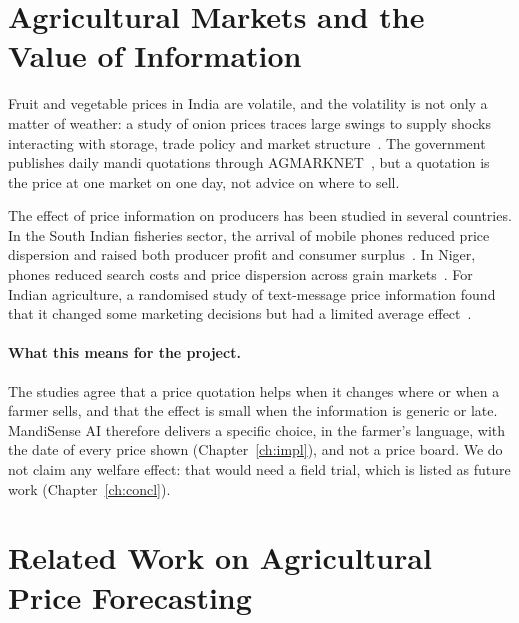 \section{Agricultural Markets and the Value of Information}
\label{sec:lit-markets}

Fruit and vegetable prices in India are volatile, and the volatility is not only a matter of weather: a study of onion prices traces large swings to supply shocks interacting with storage, trade policy and market structure~\cite{birthal2019}. The government publishes daily mandi quotations through AGMARKNET~\cite{agmarknet}, but a quotation is the price at one market on one day, not advice on where to sell.

The effect of price information on producers has been studied in several countries. In the South Indian fisheries sector, the arrival of mobile phones reduced price dispersion and raised both producer profit and consumer surplus~\cite{jensen2007}. In Niger, phones reduced search costs and price dispersion across grain markets~\cite{aker2010}. For Indian agriculture, a randomised study of text-message price information found that it changed some marketing decisions but had a limited average effect~\cite{fafchamps2012}.

\paragraph{What this means for the project.} The studies agree that a price quotation helps when it changes where or when a farmer sells, and that the effect is small when the information is generic or late. MandiSense AI therefore delivers a specific choice, in the farmer's language, with the date of every price shown (Chapter~\ref{ch:impl}), and not a price board. We do not claim any welfare effect: that would need a field trial, which is listed as future work (Chapter~\ref{ch:concl}).

\section{Related Work on Agricultural Price Forecasting}
\label{sec:related-forecast}

